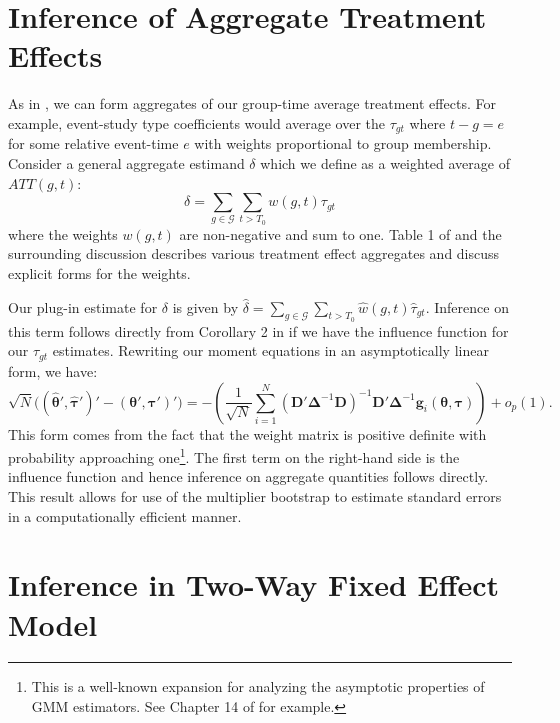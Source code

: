 \documentclass[12pt]{article}
\begin{document}
\section{Inference of Aggregate Treatment Effects}

As in \citet{Callaway_Santanna_2021}, we can form aggregates of our group-time average treatment effects. For example, event-study type coefficients would average over the $\tau_{gt}$ where $t - g = e$ for some relative event-time $e$ with weights proportional to group membership. Consider a general aggregate estimand $\delta$ which we define as a weighted average of $ATT(g,t)$:
\begin{equation}
\delta = \sum_{g\in \mathcal{G}} \sum_{t > T_0} w(g,t) \tau_{gt}
\end{equation}
where the weights $w(g,t)$ are non-negative and sum to one. Table 1 of \citet{Callaway_Santanna_2021} and the surrounding discussion describes various treatment effect aggregates and discuss explicit forms for the weights. 

Our plug-in estimate for $\delta$ is given by $\hat{\delta} = \sum_{g\in \mathcal{G}} \sum_{t > T_0} \hat{w}(g,t) \hat{\tau}_{gt}$. Inference on this term follows directly from Corollary 2 in \citet{Callaway_Santanna_2021} if we have the influence function for our $\tau_{gt}$ estimates. Rewriting our moment equations in an asymptotically linear form, we have:
\begin{equation}
    \sqrt{N}\Big( (\widehat{\bm{\theta}}', \widehat{\bm \tau}')' - (\bm{\theta}', \bm \tau')' \Big) = - \left( \frac{1}{\sqrt{N}} \sum_{i = 1}^N (\bm D' \bm \Delta^{-1} \bm D)^{-1} \bm D' \bm \Delta^{-1} \bm g_i(\bm{\theta}, \bm \tau) \right) + o_p(1).
\end{equation}
This form comes from the fact that the weight matrix is positive definite with probability approaching one\footnote{This is a well-known expansion for analyzing the asymptotic properties of GMM estimators. See Chapter 14 of \citet{Wooldridge_2010} for example.}. The first term on the right-hand side is the influence function and hence inference on aggregate quantities follows directly. This result allows for use of the multiplier bootstrap to estimate standard errors in a computationally efficient manner.

\section{Inference in Two-Way Fixed Effect Model}\label{sec:twfe_inference}
\end{document}
